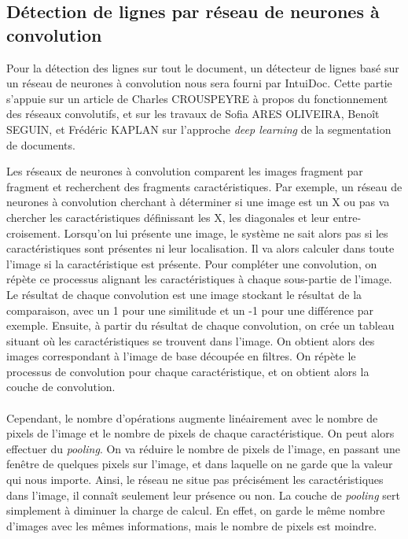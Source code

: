 \subsection{Détection de lignes par réseau de neurones à convolution}

Pour la détection des lignes sur tout le document, un détecteur de lignes basé sur un réseau de neurones à convolution nous sera
fourni par IntuiDoc. Cette partie s'appuie sur un article\cite{crouspeyre:2017} de Charles CROUSPEYRE à propos du fonctionnement des
réseaux convolutifs, et sur les travaux de Sofia ARES OLIVEIRA, Benoît SEGUIN, et Frédéric KAPLAN\cite{} sur l’approche \textit{deep learning} de la segmentation
de documents. 

Les réseaux de neurones à convolution comparent les images fragment par fragment et recherchent des fragments caractéristiques.
Par exemple, un réseau de neurones à convolution cherchant à déterminer si une image est un X ou pas va chercher les caractéristiques
définissant les X, les diagonales et leur entre-croisement. Lorsqu'on lui présente une image, le système ne sait alors pas si les
caractéristiques sont présentes ni leur localisation. Il va alors calculer dans toute l'image si la caractéristique est présente.
Pour compléter une convolution, on répète ce processus alignant les caractéristiques à chaque sous-partie de l'image.
Le résultat de chaque convolution est une image stockant le résultat de la comparaison, avec un 1 pour une similitude et un -1
pour une différence par exemple. Ensuite, à partir du résultat de chaque convolution, on crée un tableau situant où les
caractéristiques se trouvent dans l'image. On obtient alors des images correspondant à l'image de base découpée en filtres.
On répète le processus de convolution pour chaque caractéristique, et on obtient alors la couche de convolution.

\paragraph{}
Cependant, le nombre d'opérations augmente linéairement avec le nombre de pixels de l'image et le
nombre de pixels de chaque caractéristique. On peut alors effectuer du \textit{pooling}. On va
réduire le nombre de pixels de l'image, en passant une fenêtre de quelques pixels sur l'image,
et dans laquelle on ne garde que la valeur qui nous importe. Ainsi, le réseau ne situe pas précisément
les caractéristiques dans l'image, il connaît seulement leur présence ou non. La couche de
\textit{pooling} sert simplement à diminuer la charge de calcul. En effet, on garde le même nombre
d'images avec les mêmes informations, mais le nombre de pixels est moindre.


